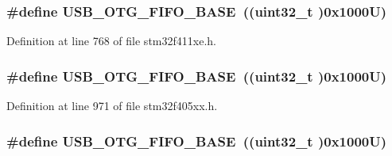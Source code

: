 \subsubsection[{\texorpdfstring{U\+S\+B\+\_\+\+O\+T\+G\+\_\+\+F\+I\+F\+O\+\_\+\+B\+A\+SE}{USB_OTG_FIFO_BASE}}]{\setlength{\rightskip}{0pt plus 5cm}\#define U\+S\+B\+\_\+\+O\+T\+G\+\_\+\+F\+I\+F\+O\+\_\+\+B\+A\+SE~((uint32\+\_\+t )0x1000\+U)}\hypertarget{group___peripheral__registers__structures_gace340350802904868673f0e839c4fa04}{}\label{group___peripheral__registers__structures_gace340350802904868673f0e839c4fa04}


Definition at line 768 of file stm32f411xe.\+h.

\subsubsection[{\texorpdfstring{U\+S\+B\+\_\+\+O\+T\+G\+\_\+\+F\+I\+F\+O\+\_\+\+B\+A\+SE}{USB_OTG_FIFO_BASE}}]{\setlength{\rightskip}{0pt plus 5cm}\#define U\+S\+B\+\_\+\+O\+T\+G\+\_\+\+F\+I\+F\+O\+\_\+\+B\+A\+SE~((uint32\+\_\+t )0x1000\+U)}\hypertarget{group___peripheral__registers__structures_gace340350802904868673f0e839c4fa04}{}\label{group___peripheral__registers__structures_gace340350802904868673f0e839c4fa04}


Definition at line 971 of file stm32f405xx.\+h.

\subsubsection[{\texorpdfstring{U\+S\+B\+\_\+\+O\+T\+G\+\_\+\+F\+I\+F\+O\+\_\+\+B\+A\+SE}{USB_OTG_FIFO_BASE}}]{\setlength{\rightskip}{0pt plus 5cm}\#define U\+S\+B\+\_\+\+O\+T\+G\+\_\+\+F\+I\+F\+O\+\_\+\+B\+A\+SE~((uint32\+\_\+t )0x1000\+U)}\hypertarget{group___peripheral__registers__structures_gace340350802904868673f0e839c4fa04}{}\label{group___peripheral__registers__structures_gace340350802904868673f0e839c4fa04}


